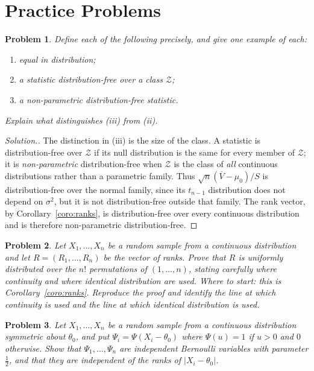 \documentclass[12pt,a4paper]{report}
\theoremstyle{definition}
\theoremstyle{plain}
\newtheorem{problemx}{Problem}[section]
\newenvironment{problem}{\begin{problemx}}{\end{problemx}}
\newenvironment{solution}
  {\renewcommand{\qedsymbol}{}\begin{proof}[\textit{Solution}.]}
  {\end{proof}}
\begin{document}
\section{Practice Problems}

\begin{problem}
Define each of the following precisely, and give one example of each:
\begin{enumerate}
\item[(i)] equal in distribution;
\item[(ii)] a statistic distribution-free over a class $\mathscr{Z}$;
\item[(iii)] a non-parametric distribution-free statistic.
\end{enumerate}
Explain what distinguishes (iii) from (ii).
\end{problem}

\begin{solution}
The distinction in (iii) is the size of the class. A statistic is
distribution-free over $\mathscr{Z}$ if its null distribution is the same for
every member of $\mathscr{Z}$; it is \emph{non-parametric} distribution-free
when $\mathscr{Z}$ is the class of \emph{all} continuous distributions rather
than a parametric family. Thus $\sqrt{n}(\overline{V}-\mu_0)/S$ is
distribution-free over the normal family, since its $t_{n-1}$ distribution does
not depend on $\sigma^{2}$, but it is not distribution-free outside that family.
The rank vector, by Corollary~\ref{coro:ranks}, is distribution-free over every
continuous distribution and is therefore non-parametric distribution-free.
\end{solution}

\begin{problem}
Let $X_1,\dots,X_n$ be a random sample from a continuous distribution and let
$R=(R_1,\dots,R_n)$ be the vector of ranks. Prove that $R$ is uniformly
distributed over the $n!$ permutations of $(1,\dots,n)$, stating carefully where
continuity and where identical distribution are used.
\emph{Where to start: this is Corollary~\ref{coro:ranks}. Reproduce the proof and identify the line at which continuity is used and the line at which identical distribution is used.}
\end{problem}

\begin{problem}
Let $X_1,\dots,X_n$ be a random sample from a continuous distribution symmetric
about $\theta_0$, and put $\Psi_i = \Psi(X_i-\theta_0)$ where $\Psi(u)=1$ if
$u>0$ and $0$ otherwise. Show that $\Psi_1,\dots,\Psi_n$ are independent
Bernoulli variables with parameter $\tfrac12$, and that they are independent of
the ranks of $\left|X_i-\theta_0\right|$.
\end{problem}
\end{document}
